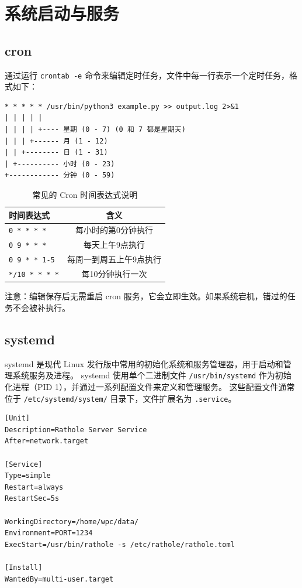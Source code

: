 \section{系统启动与服务}
\subsection{cron}
通过运行 \verb|crontab -e| 命令来编辑定时任务，文件中每一行表示一个定时任务，格式如下：

\begin{code}[title=cron 任务格式]
	\begin{verbatim}
* * * * * /usr/bin/python3 example.py >> output.log 2>&1
| | | | |
| | | | +---- 星期 (0 - 7) (0 和 7 都是星期天)
| | | +------ 月 (1 - 12)
| | +-------- 日 (1 - 31)
| +---------- 小时 (0 - 23)
+------------ 分钟 (0 - 59)
    \end{verbatim}
\end{code}

\begin{table}[h]
	\centering
	\begin{tabular}{|l|c|}
		\hline
		\textbf{时间表达式}        & \textbf{含义}  \\
		\hline
		\texttt{0 * * * *}    & 每小时的第0分钟执行   \\
		\texttt{0 9 * * *}    & 每天上午9点执行     \\
		\texttt{0 9 * * 1-5}  & 每周一到周五上午9点执行 \\
		\texttt{*/10 * * * *} & 每10分钟执行一次    \\
		\hline
	\end{tabular}
	\caption{常见的 Cron 时间表达式说明}
\end{table}

注意：编辑保存后无需重启 cron 服务，它会立即生效。如果系统宕机，错过的任务不会被补执行。

\subsection{systemd}
systemd 是现代 Linux 发行版中常用的初始化系统和服务管理器，用于启动和管理系统服务及进程。
systemd 使用单个二进制文件 \verb|/usr/bin/systemd| 作为初始化进程（PID 1），并通过一系列配置文件来定义和管理服务。
这些配置文件通常位于 \verb|/etc/systemd/system/| 目录下，文件扩展名为 \verb|.service|。

\begin{code}[title=/etc/systemd/system/rathole.service]
	\begin{verbatim}
[Unit]
Description=Rathole Server Service
After=network.target

[Service]
Type=simple
Restart=always
RestartSec=5s

WorkingDirectory=/home/wpc/data/
Environment=PORT=1234
ExecStart=/usr/bin/rathole -s /etc/rathole/rathole.toml

[Install]
WantedBy=multi-user.target
    \end{verbatim}
\end{code}

